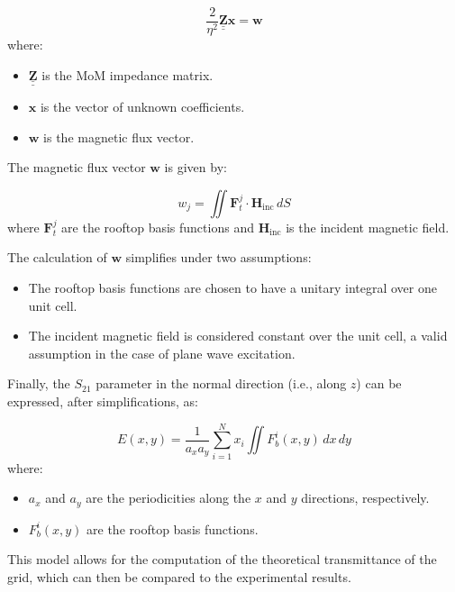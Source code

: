 \documentclass{article}
\begin{document}
\begin{equation}
    \label{eq:MoM-lin-sys}
    \frac{2}{\eta^2} \underline{\underline{\boldsymbol{Z}}} \boldsymbol{x} = \boldsymbol{w}
\end{equation}
where:
\begin{itemize}
    \item \(\underline{\underline{\boldsymbol{Z}}}\) is the MoM impedance matrix.
    \item \(\boldsymbol{x}\) is the vector of unknown coefficients.
    \item \(\boldsymbol{w}\) is the magnetic flux vector.
\end{itemize}

The magnetic flux vector \(\boldsymbol{w}\) is given by:

\begin{equation}
    \label{eq:magnetic-flux}
    w_j = \iint \boldsymbol{F}_t^j \cdot \boldsymbol{H}_{\text{inc}} \, dS
\end{equation}
where \(\boldsymbol{F}_t^j\) are the rooftop basis functions and \(\boldsymbol{H}_{\text{inc}}\) is the incident magnetic field.

The calculation of \(\boldsymbol{w}\) simplifies under two assumptions:
\begin{itemize}
    \item The rooftop basis functions are chosen to have a unitary integral over one unit cell.
    \item The incident magnetic field is considered constant over the unit cell, a valid assumption in the case of plane wave excitation.
\end{itemize}

Finally, the \(S_{21}\) parameter in the normal direction (i.e., along \(z\)) can be expressed, after simplifications, as:

\begin{equation}
    \label{eq:normal-direction-S21}
    E(x,y) = \frac{1}{a_x a_y} \sum_{i=1}^{N} x_i \iint F_b^i(x,y) \, dx \, dy
\end{equation}
where:
\begin{itemize}
    \item \(a_x\) and \(a_y\) are the periodicities along the \(x\) and \(y\) directions, respectively.
    \item \(F_b^i(x,y)\) are the rooftop basis functions.
\end{itemize}

This model allows for the computation of the theoretical transmittance of the grid, which can then be compared to the experimental results.
\end{document}
